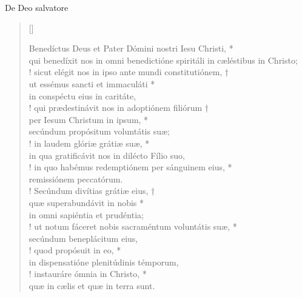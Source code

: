


\def\greinitialformat#1{%
{\fontsize{39}{39}\selectfont #1}%
}




\vspace{0.3cm}
\begin{center}
 
De Deo salvatore\\
\end{center}
\begin{verse}[\versewidth]

 	

Benedíctus Deus et Pater
	Dómini nostri Iesu Christi, *\\
qui benedíxit nos in omni benedictióne spiritáli
	in cæléstibus in Christo;\\!
\vin sicut elégit nos in ipso ante mundi constitutiónem, †\\
\vin ut essémus sancti et immaculáti *\\
\vin in conspéctu eius in caritáte,\\!
qui prædestinávit nos in adoptiónem filiórum †\\
per Iesum Christum in ipsum, *\\
secúndum propósitum voluntátis suæ;\\!
\vin in laudem glóriæ grátiæ suæ, *\\
\vin in qua gratificávit nos in dilécto Fílio suo,\\!
in quo habémus redemptiónem per sánguinem eius, *\\
remissiónem peccatórum.\\!
\vin Secúndum divítias grátiæ eius, †\\
\vin quæ superabundávit in nobis *\\
\vin in omni sapiéntia et prudéntia;\\!
ut notum fáceret nobis
	sacraméntum voluntátis suæ, *\\
secúndum beneplácitum eius,\\!
\vin quod propósuit in eo, *\\
\vin in dispensatióne plenitúdinis témporum,\\!
instauráre ómnia in Christo, *\\
quæ in cælis et quæ in terra sunt.\\
\end{verse}
\vspace{1cm}


